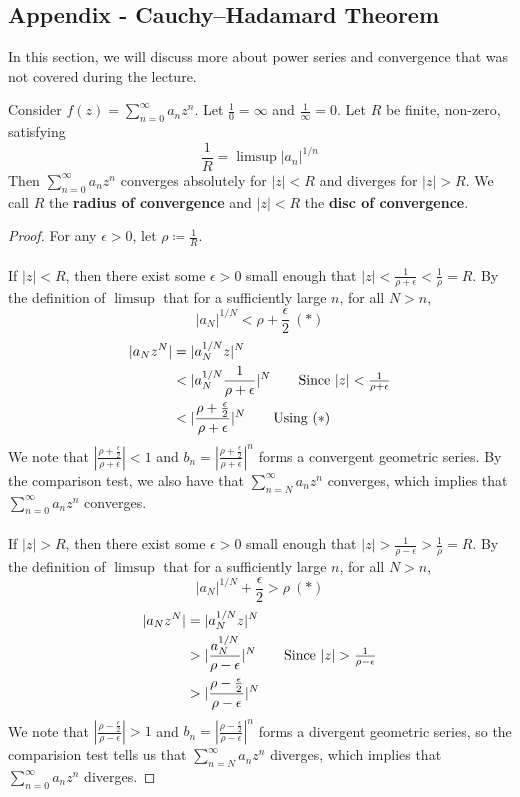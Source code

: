 \subsection{Appendix - Cauchy–Hadamard Theorem}

In this section, we will discuss more about power series and convergence that was not covered during the lecture.

\begin{theorem}
Consider $f(z) = \sum_{n = 0}^\infty a_n z^n$. Let $\frac{1}{0} = \infty$ and $\frac{1}{\infty} = 0$. Let $R$ be finite, non-zero, satisfying
\[\frac{1}{R} = \limsup |a_n|^{1/n}\]
Then $\sum_{n = 0}^\infty a_n z^n$ converges absolutely for $|z| < R$ and diverges for $|z| > R$. We call $R$ the \textbf{radius of convergence} and $|z| < R$ the \textbf{disc of convergence}.
\end{theorem}

\begin{proof}
For any $\epsilon > 0$, let $\rho \coloneqq \frac{1}{R}$.\\\\
If $|z| < R$, then there exist some $\epsilon > 0$ small enough that $|z| < \frac{1}{\rho + \epsilon} < \frac{1}{\rho} = R$. By the definition of $\limsup$ that for a sufficiently large $n$, for all $N > n$, 
\[|a_N|^{1/N} < \rho + \frac{\epsilon}{2} \ (*)\]
\begin{align*}
    |a_N z^N| &= |a_N^{1/N} z|^N\\
    &< |a_N^{1/N} \frac{1}{\rho + \epsilon}|^N \tag*{Since $|z| < \frac{1}{\rho + \epsilon}$}\\
    &< |\frac{\rho + \frac{\epsilon}{2}}{\rho + \epsilon}|^N \tag*{Using $(*)$}\\
\end{align*}
We note that $|\frac{\rho + \frac{\epsilon}{2}}{\rho + \epsilon}| < 1$ and $b_n = |\frac{\rho + \frac{\epsilon}{2}}{\rho + \epsilon}|^n$ forms a convergent geometric series. By the comparison test, we also have that $\sum_{n = N}^\infty a_n z^n$ converges, which implies that $\sum_{n = 0}^\infty a_n z^n$ converges.\\\\
If $|z| > R$, then there exist some $\epsilon > 0$ small enough that $|z| > \frac{1}{\rho - \epsilon} > \frac{1}{\rho} = R$. By the definition of $\limsup$ that for a sufficiently large $n$, for all $N > n$, 
\[|a_N|^{1/N} + \frac{\epsilon}{2} > \rho \ (*)\]
\begin{align*}
    |a_N z^N| &= |a_N^{1/N} z|^N\\
    &> |\frac{a_N^{1/N}}{\rho - \epsilon}|^N \tag*{Since $|z| > \frac{1}{\rho - \epsilon}$}\\
    &> |\frac{\rho - \frac{\epsilon}{2}}{\rho - \epsilon}|^N
\end{align*}
We note that $|\frac{\rho - \frac{\epsilon}{2}}{\rho - \epsilon}| > 1$ and $b_n = |\frac{\rho - \frac{\epsilon}{2}}{\rho - \epsilon}|^n$ forms a divergent geometric series, so the comparision test tells us that $\sum_{n = N}^\infty a_n z^n$ diverges, which implies that $\sum_{n = 0}^\infty a_n z^n$ diverges.
\end{proof}

